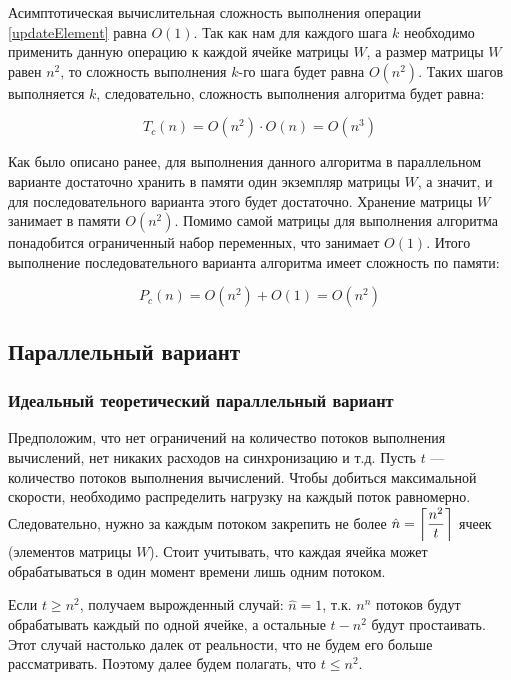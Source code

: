 \documentclass{article}
\DeclarePairedDelimiter{\ceil}{\lceil}{\rceil}
\begin{document}
	Асимптотическая вычислительная сложность выполнения операции \ref{updateElement} равна $O(1)$. Так как нам для каждого шага $k$ необходимо применить данную операцию к каждой ячейке матрицы $W$, а размер матрицы $W$ равен $n^2$, то сложность выполнения $k$-го шага будет равна $O(n^2)$. Таких шагов выполняется $k$, следовательно, сложность выполнения алгоритма будет равна:
	
	\begin{equation} \label{consistentEquationDifficulty}
		T_c(n) = O(n^2)  \cdot  O(n) = O(n^3)
	\end{equation}
	
	Как было описано ранее, для выполнения данного алгоритма в параллельном варианте достаточно хранить в памяти один экземпляр матрицы $W$, а значит, и для
	последовательного варианта этого будет достаточно. Хранение матрицы $W$ занимает в памяти $O(n^2)$. Помимо самой матрицы для выполнения алгоритма понадобится ограниченный набор переменных, что занимает $O(1)$. Итого выполнение последовательного варианта алгоритма имеет сложность по памяти:
	
	\begin{equation} \label{consistentMemoryDifficulty}
		P_c(n) = O(n^2) + O(1) = O(n^2)
	\end{equation}
	
	
	\subsection{Параллельный вариант}
	
		\subsubsection{Идеальный теоретический параллельный вариант}
		
			Предположим, что нет ограничений на количество потоков выполнения вычислений, нет никаких расходов на синхронизацию и т.д. Пусть $t$ --- количество потоков выполнения вычислений. Чтобы добиться максимальной скорости, необходимо распределить нагрузку на каждый поток равномерно. Следовательно, нужно за каждым потоком закрепить не более $\hat n = \ceil*{\dfrac{n^2}{t}}$ ячеек (элементов матрицы $W$). Стоит учитывать, что каждая ячейка может обрабатываться в один момент времени лишь одним потоком.
			
			Если $t \geq n^2$, получаем вырожденный случай: $\hat n = 1$, т.к. $n^n$ потоков будут обрабатывать каждый по одной ячейке, а остальные $t-n^2$ будут простаивать. Этот случай настолько далек от реальности, что не будем его больше рассматривать. Поэтому далее будем полагать, что $t \leq n^2$.
			
\end{document}
